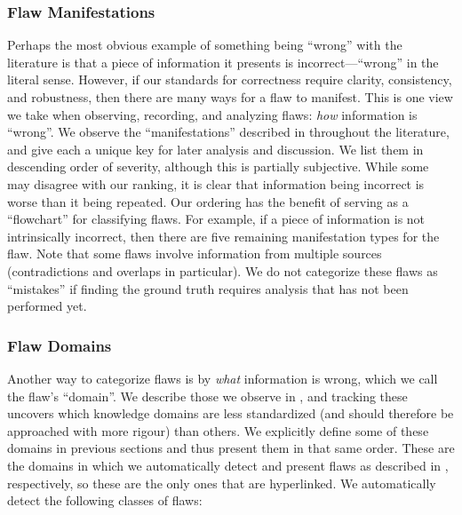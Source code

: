 \subsubsection{Flaw Manifestations}\label{mnfst-def}

Perhaps the most obvious example of something being ``wrong'' with the
literature is that a piece of information it presents is incorrect---``wrong''
in the literal sense. However, if our standards for correctness require
clarity, consistency, and robustness, then there are many ways for a flaw to
manifest. This is one view we take when observing, recording, and analyzing
flaws: \emph{how} information is ``wrong''. We observe the %
``manifestations'' described in  throughout the
literature, and give each a unique key for later analysis and discussion. We
list them in descending order of severity, although this is partially
subjective. While some may disagree with our ranking, it is clear that
information being incorrect is worse than it being repeated. Our ordering has
the benefit of serving as a ``flowchart'' for classifying flaws. For example,
if a piece of information is not intrinsically incorrect, then there are five
remaining manifestation types for the flaw. Note that some flaws involve
information from multiple sources (contradictions and overlaps in particular).
We do not categorize these flaws as ``mistakes'' if finding the ground truth
requires analysis that has not been performed yet.



\subsubsection{Flaw Domains}\label{dmn-def}

Another way to categorize flaws is by \emph{what} information is wrong, which
we call the flaw's ``domain''. We describe those we observe in
, and tracking these uncovers which knowledge domains
are less standardized (and should therefore be approached with more rigour)
than others. We explicitly define some of these domains in previous
sections and thus present them in that same order. These are the domains in
which we automatically detect and present flaws as described in \ifnotpaper
    , respectively\else {}\fi,
so these are the only ones that are
hyperlinked. We automatically detect the following classes of flaws:

